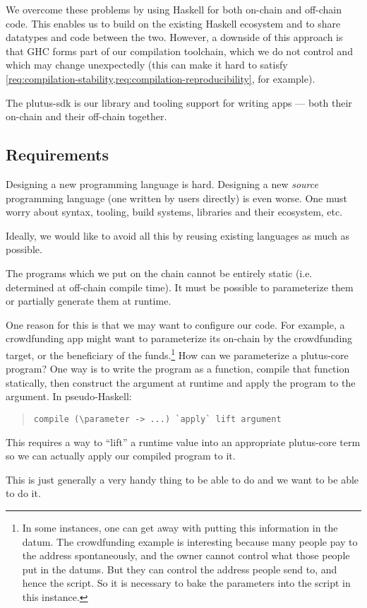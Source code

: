 We overcome these problems by using Haskell for both \gls{on-chain} and \gls{off-chain} code.
This enables us to build on the existing Haskell ecosystem and to share datatypes and code between the two.
However, a downside of this approach is that GHC forms part of our compilation toolchain, which we do not control and which may change unexpectedly (this can make it hard to satisfy \cref{req:compilation-stability,req:compilation-reproducibility}, for example).

The \gls{plutus-sdk} is our library and tooling support for writing \glspl{app} --- both their \gls{on-chain} and their \gls{off-chain} together.

\subsection{Requirements}
\begin{requirement}[Conservatism]
\label{req:source-lang-conservatism}
Designing a new programming language is hard.
Designing a new \emph{source} programming language (one written by users directly) is even worse.
One must worry about syntax, tooling, build systems, libraries and their ecosystem, etc.

Ideally, we would like to avoid all this by reusing existing languages as much as possible.
\end{requirement}

\begin{requirement}
\label{req:runtime-args}
The programs which we put on the chain cannot be entirely static (i.e. determined at \gls{off-chain} compile time).
It must be possible to parameterize them or partially generate them at runtime.

One reason for this is that we may want to configure our code.
For example, a crowdfunding \gls{app} might want to parameterize its \gls{on-chain} by the crowdfunding target, or the beneficiary of the funds.\footnote{
In some instances, one can get away with putting this information in the \gls{datum}.
The crowdfunding example is interesting because many people pay to the \gls{address} spontaneously, and the owner cannot control what those people put in the \glspl{datum}.
But they can control the \gls{address} people send to, and hence the \gls{script}.
So it is necessary to bake the parameters into the \gls{script} in this instance.
}
How can we parameterize a \gls{plutus-core} program?
One way is to write the program as a function, compile that function statically, then construct the argument at runtime and apply the program to the argument.
In pseudo-Haskell:
\begin{quote}
\begin{verbatim}
compile (\parameter -> ...) `apply` lift argument
\end{verbatim}
\end{quote}
\noindent This requires a way to ``lift'' a runtime value into an appropriate \gls{plutus-core} term so we can actually apply our compiled program to it.

This is just generally a very handy thing to be able to do and we want to be able to do it.
\end{requirement}

